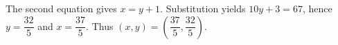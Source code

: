 The second equation gives $x=y+1$. Substitution yields $10y+3=67$, hence $y=\dfrac{32}{5}$ and $x=\dfrac{37}{5}$. Thus $\boxed{(x,y)=(\dfrac{37}{5},\dfrac{32}{5})}$.
